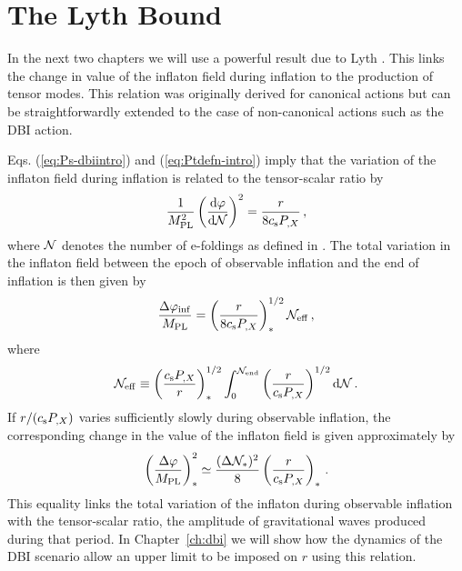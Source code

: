 \section{The Lyth Bound}
\label{sec:lyth-dbiintro}
In the next two chapters we will use a powerful result due to Lyth \cite{lyth}. This
links the change in value of the inflaton field during inflation to the production of tensor
modes. This relation was originally derived for canonical actions but can be straightforwardly
extended to the case of non-canonical actions such as the DBI action.

Eqs. (\ref{eq:Ps-dbiintro}) and (\ref{eq:Ptdefn-intro}) imply 
that the variation of the inflaton field during inflation  
is related to the tensor-scalar ratio by \cite{lyth,bmpaper}
% 
\begin{equation}
\label{eq:genlyth-dbiintro}
\frac{1}{M_{\mathrm{PL}}^2}
\left( \frac{\mathrm{d} \varphi}{\mathrm{d} \mathcal{N}} \right)^2 = \frac{r}{8 c_\mathrm{s} P_{,X}}
\,,
\end{equation}
% 
where $\mathcal{N}$ denotes the number of e-foldings as defined in
. 
The total variation in the inflaton field between the epoch of observable 
inflation and the end of inflation is then given by
% 
\begin{equation}
\label{eq:totalfield-dbiintro}
\frac{\Delta \varphi_{\rm inf}}{M_{\mathrm{PL}}} = 
\left( \frac{r}{8 c_\mathrm{s} P_{,X}} \right)_*^{1/2} \mathcal{N}_\mathrm{eff} \,,
\end{equation}
% 
where
% 
\begin{equation}
\label{eq:Neff-dbiintro}
\mathcal{N}_\mathrm{eff} \equiv \left( \frac{c_\mathrm{s} P_{,X}}{r}\right)_*^{1/2}
\int_0^{\mathcal{N}_{\rm end}}  
\left( \frac{r}{c_\mathrm{s} P_{,X}} \right)^{1/2} \mathrm{d} \mathcal{N} \,.
\end{equation}
% 
If $r/(c_\mathrm{s} P_{,X})$ varies 
sufficiently slowly during observable inflation, 
the corresponding change in the value of the inflaton  
field is given approximately by \cite{lyth,bmpaper}
% 
\begin{equation}
\label{eq:approxlyth-dbiintro}
\left( \frac{\Delta \varphi}{M_{\mathrm{PL}}} \right)_*^2 \simeq 
\frac{(\Delta \mathcal{N}_*)^2}{8} \left( \frac{r}{c_\mathrm{s} P_{,X}} \right)_* \,.
\end{equation}
% 
This equality links the total variation of the inflaton during observable inflation
with the tensor-scalar ratio, \iec the amplitude of gravitational waves produced
during that period. In Chapter~\ref{ch:dbi} we will show how the dynamics of the
DBI scenario allow an upper limit to be imposed on $r$ using this relation.


